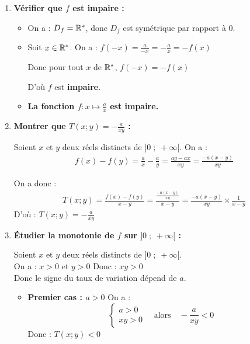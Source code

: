 \documentclass[10pt, a4paper]{article}
\begin{document}
\begin{Solution}[ACTIVITÉ][5]
\begin{enumerate}[leftmargin=*,itemsep=0.5pt]
\item \textbf{Vérifier que $f$ est impaire :}
\begin{itemize}[leftmargin=*,itemsep=0.5pt]
    \item On a :  $D_f = \mathbb{R}^*$, donc $D_f$ est symétrique par rapport à $0$.
    \item Soit $x \in \mathbb{R}^*$. On a :
             $f(-x) = \frac{a}{-x} = -\frac{a}{x} = -f(x) $
             
    Donc pour tout $x$ de $\mathbb{R}^*$, $f(-x)=-f(x)$
    
    D'où $f$ est \textbf{impaire}.
\end{itemize}

\begin{itemize}[label=$\blacktriangleright$, leftmargin=*, nosep]
\item \textbf{La fonction $f : x \mapsto \frac{a}{x}$ est \textcolor{PrimaryColor}{impaire}.}
\end{itemize}

\item \textbf{Montrer que $T(x;y) = -\frac{a}{xy}$ :}

Soient $x$ et $y$ deux réels distincts de $\big]0 \;;\; +\infty\big[$. On a :
\begin{align*}
    f(x) - f(y) = \frac{a}{x} - \frac{a}{y} 
    = \frac{ay - ax}{xy} 
    = \frac{-a(x - y)}{xy}
\end{align*}

On a donc :
\begin{align*}
    T(x;y) = \frac{f(x) - f(y)}{x - y} 
    = \frac{\frac{-a(x - y)}{xy}}{x - y} 
    = \frac{-a(x - y)}{xy} \times \frac{1}{x - y} 
\end{align*}
D'où : \quad $T(x;y) = -\frac{a}{xy}$ 

\item \textbf{Étudier la monotonie de $f$ sur $\big]0 \;;\; +\infty\big[$ :}

Soient $x$ et $y$ deux réels distincts de $\big]0 \;;\; +\infty\big[$. \\
On a : \quad $x > 0$ et $y > 0$
Donc : \quad $xy > 0$ \\
Donc le signe du taux de variation dépend de $a$.
\begin{itemize}[leftmargin=*,itemsep=0.5pt]
    \item \textbf{Premier cas : $a > 0$}
    On a :
    \[ \begin{cases} 
        a > 0 \\ 
        xy > 0 
    \end{cases} \quad \text{alors} \quad -\frac{a}{xy} < 0 \]
    Donc : \quad $T(x;y) < 0$
    

\end{itemize}
\end{enumerate}
\end{Solution}
\end{document}
